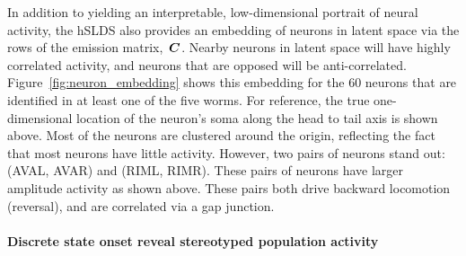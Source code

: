 \documentclass{article}
\begin{document}
In addition to yielding an interpretable, low-dimensional portrait
of neural activity, the hSLDS also provides an embedding of neurons
in latent space via the rows of the emission matrix,~$\boldsymbol{C}$. Nearby
neurons in latent space will have highly correlated activity, and neurons
that are opposed will be anti-correlated. Figure~\ref{fig:neuron_embedding}
shows this embedding for the 60 neurons that are identified in at least
one of the five worms. For reference, the true one-dimensional location
of the neuron's soma along the head to tail axis is shown above.
Most of the neurons are clustered around the origin, reflecting the fact
that most neurons have little activity. However, two pairs of neurons
stand out: (AVAL, AVAR) and (RIML, RIMR). These pairs of neurons have larger
amplitude activity as shown above. These pairs both drive backward locomotion
(reversal), and are correlated via a gap junction.

\paragraph{Discrete state onset reveal stereotyped population activity}
\end{document}
